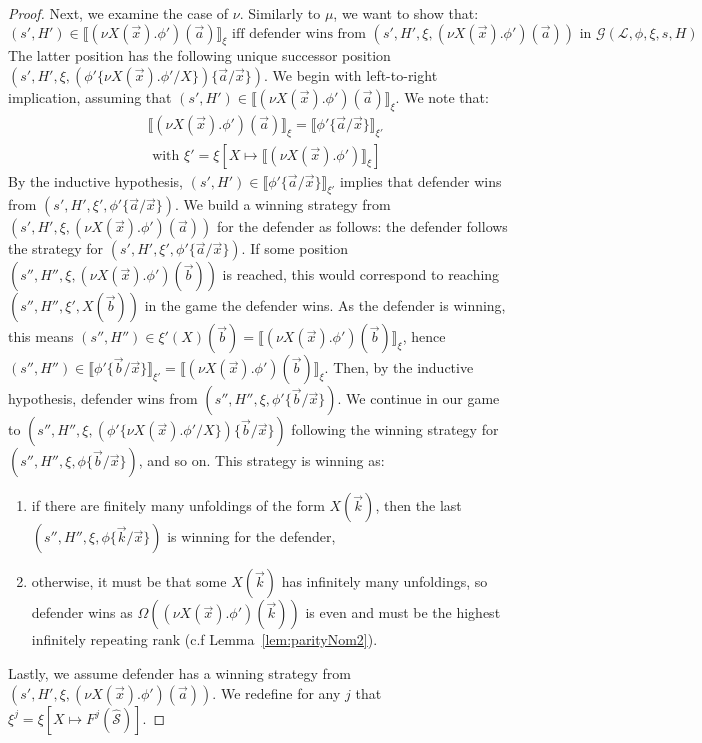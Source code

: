 \documentclass[10pt,a4paper]{article}
\theoremstyle{definition}
\theoremstyle{remark}
\newcommand\sem[2][\xi]{\llbracket#2\rrbracket_{#1}}
\newcommand\Gcal{\mathcal{G}}
\newcommand\Lcal{\mathcal{L}}
\newcommand\Scal{\mathcal{S}}
\newcommand\fstates[0]{\hat{\Scal}}
\begin{document}
\begin{proof}
	Next, we examine the case of $\nu$. 
	Similarly to $\mu$, we want to show that:
		\[
	(s', H')\in \sem{(\nu X(\vec x).\phi')(\vec a)} \text{ iff defender wins from }(s', H', \xi, (\nu X(\vec x).\phi')(\vec a))\text{ in }\Gcal(\Lcal, \phi, \xi, s, H)
	\]
	The latter position has the following unique successor position
	$(s', H', \xi, (\phi'\{\nu X(\vec x).\phi'/X\})\{\vec a/\vec x\})$.
	We begin with left-to-right implication, assuming that $(s', H')\in \sem{(\nu X(\vec x).\phi')(\vec a)}$.
	We note that:
	\begin{align*}
		&\sem{(\nu X(\vec x).\phi')(\vec a)} = \sem[\xi']{\phi'\{\vec a / \vec x\}}\\
		&\text{ with } \xi' = \xi[X \mapsto \sem{(\nu X(\vec x).\phi')}]
	\end{align*}
	By the inductive hypothesis, $(s', H') \in \sem[\xi']{\phi'\{\vec a / \vec x\}}$ implies that defender wins from $(s', H', \xi', \phi'\{\vec a / \vec x\})$.
	We build a winning strategy 
	from $(s', H',\xi,(\nu X(\vec x).\phi')(\vec a))$
	for the defender as follows: the defender follows the strategy for $(s', H', \xi', \phi'\{\vec a / \vec x\})$.
	If some position $(s'', H'', \xi, (\nu X(\vec x).\phi')(\vec b))$ is reached, this would correspond to reaching $(s'', H'', \xi', X(\vec b))$ in the game the defender wins. 
	As the defender is winning, this means $(s'', H'')\in \xi'(X)(\vec b) = \sem{(\nu X(\vec x).\phi')(\vec b)}$, hence $(s'', H'')\in \sem[\xi']{\phi'\{\vec b / \vec x\}} = \sem{(\nu X(\vec x).\phi')(\vec b)}$.
	Then, by the inductive hypothesis, defender wins from $(s'', H'', \xi, \phi'\{\vec b / \vec x\})$. 
	We continue in our game to $(s'', H'',\xi, (\phi'\{\nu X(\vec x).\phi'/X\})\{\vec b / \vec x\})$ following the winning strategy for $(s'', H'', \xi, \phi\{\vec b / \vec x\})$, and so on.
	This strategy is winning as:
	\begin{enumerate}
		\item if there are finitely many unfoldings of the form $X(\vec k)$, then the last $(s'', H'', \xi, \phi\{\vec k / \vec x\})$ is winning for the defender,
		\item otherwise, it must be that 
		some $X(\vec k)$ has infinitely many unfoldings, so defender wins as $\Omega((\nu X(\vec x).\phi')(\vec k))$ is even and must be the highest infinitely repeating rank (c.f Lemma~\ref{lem:parityNom2}).
	\end{enumerate}
		Lastly, we assume defender has a winning strategy from $(s', H', \xi, (\nu X(\vec x).\phi')(\vec a))$. 
	We redefine for any $j$ that $\xi^j = \xi[X \mapsto F^j(\fstates)]$.

\end{proof}
\end{document}
